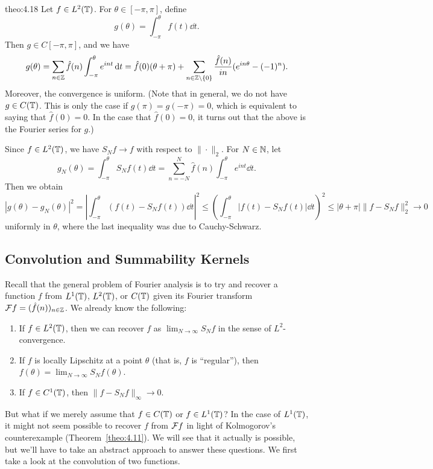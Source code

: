 \begin{theo}{theo:4.18}
    Let $f \in L^2(\mathbb{T})$. For $\theta \in [-\pi, \pi]$, define 
    \[ g(\theta) = \int_{-\pi}^\theta f(t)\dd t. \] 
    Then $g \in C[-\pi, \pi]$, and we have 
    \begin{align*}
        g(\theta) = \sum_{n\in\mathbb{Z}} \hat f(n) \int_{-\pi}^\theta  e^{int}\,\mathrm{d} t 
        = \hat f(0) (\theta + \pi) + \sum_{n\in\mathbb{Z}\setminus\{0\}} 
        \frac{\hat f(n)}{in} (e^{in\theta} - (-1)^n). 
    \end{align*}
    Moreover, the convergence is uniform. (Note that in general, 
    we do not have $g \in C(\mathbb{T})$. This is only the case if 
    $g(\pi) = g(-\pi) = 0$, which is equivalent to saying that 
    $\hat f(0) = 0$. In the case that $\hat f(0) = 0$, it turns out 
    that the above is the Fourier series for $g$.)
\end{theo}
\begin{pf}
    Since $f \in L^2(\mathbb{T})$, we have $S_N f \to f$ with respect to $\|\cdot\|_2$. 
    For $N \in \mathbb{N}$, let 
    \[ g_N(\theta) = \int_{-\pi}^\theta S_N f(t)\dd t = 
    \sum_{n=-N}^N \hat f(n) \int_{-\pi}^\theta e^{int}\dd t. \] 
    Then we obtain 
    \[ |g(\theta) - g_N(\theta)|^2 
    = \left| \int_{-\pi}^\theta (f(t) - S_Nf(t))\dd t \right|^2 
    \leq \left( \int_{-\pi}^\theta |f(t) - S_Nf(t)|\dd t \right)^{\!2} 
    \leq |\theta + \pi| \|f - S_N f\|_2^2  \to 0 \] 
    uniformly in $\theta$, where the last inequality was due 
    to Cauchy-Schwarz. 
\end{pf}

\subsection{Convolution and Summability Kernels} \label{subsec:4.4}
Recall that the general problem of Fourier analysis is to try 
and recover a function $f$ from $L^1(\mathbb{T})$, $L^2(\mathbb{T})$, or $C(\mathbb{T})$ 
given its Fourier transform ${\cal F}f = (\hat f(n))_{n\in\mathbb{Z}}$. 
We already know the following: 
\begin{enumerate}[(1)]
    \item If $f \in L^2(\mathbb{T})$, then we can recover $f$ as 
    $\lim_{N\to\infty} S_N f$ in the sense of $L^2$-convergence. 
    \item If $f$ is locally Lipschitz at a point $\theta$ (that is, 
    $f$ is ``regular''), then $f(\theta) = \lim_{N\to\infty} S_N f(\theta)$. 
    \item If $f \in C^1(\mathbb{T})$, then $\|f - S_N f\|_\infty \to 0$. 
\end{enumerate}
But what if we merely assume that $f \in C(\mathbb{T})$ or $f \in L^1(\mathbb{T})$? 
In the case of $L^1(\mathbb{T})$, it might not seem possible to recover 
$f$ from ${\cal F}f$ in light of Kolmogorov's counterexample 
(Theorem~\ref{theo:4.11}). We will see that it actually is possible, 
but we'll have to take an abstract approach to answer these questions. 
We first take a look at the convolution of two functions. 


